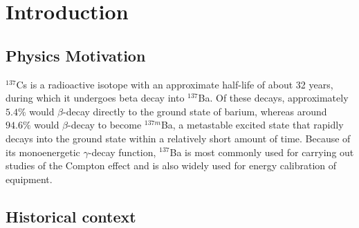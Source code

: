\documentclass[10pt,letterpaper,onecolumn]{article}
\begin{document}


\section{Introduction}

\subsection{Physics Motivation}

$^{137}$Cs is a radioactive isotope with an approximate half-life of about 32 years, during which it undergoes beta decay into $^{137}$Ba. Of these decays, approximately $5.4\%$ would $\beta$-decay directly to the ground state of barium, whereas around $94.6\%$ would $\beta$-decay to become $^{137m}$Ba, a metastable excited state that rapidly decays into the ground state within a relatively short amount of time. Because of its monoenergetic $\gamma$-decay function, $^{137}$Ba is most commonly used for carrying out studies of the Compton effect and is also widely used for energy calibration of equipment. \cite{cassy} 

\subsection{Historical context}
\end{document}
